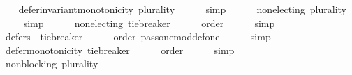 \begin{isabellebody}
\isanewline
\ \ \isamarkupfalse%
\ {}{}{}{}{}{\isacharcolon}{\kern0pt}\ {\isachardoublequoteopen}defer{\isacharunderscore}{\kern0pt}invariant{\isacharunderscore}{\kern0pt}monotonicity\ {\isacharparenleft}{\kern0pt}plurality{\isasymdown}{\isacharparenright}{\kern0pt}{\isachardoublequoteclose}\isanewline
\ \ \ \ \isamarkupfalse%
\ simp\ \isanewline
\ \ \isamarkupfalse%
\ {}{}{}{}{}{\isacharcolon}{\kern0pt}\ {\isachardoublequoteopen}non{\isacharunderscore}{\kern0pt}electing\ {\isacharparenleft}{\kern0pt}plurality{\isasymdown}{\isacharparenright}{\kern0pt}{\isachardoublequoteclose}\isanewline
\ \ \ \ \isamarkupfalse%
\ simp\ \isanewline
\ \ \isamarkupfalse%
\ {}{}{}{}{}{\isacharcolon}{\kern0pt}\ {\isachardoublequoteopen}non{\isacharunderscore}{\kern0pt}electing\ {\isacharquery}{\kern0pt}tie{\isacharunderscore}{\kern0pt}breaker{\isachardoublequoteclose}\isanewline
\ \ \ \ \isamarkupfalse%
\ order\isanewline
\ \ \ \ \isamarkupfalse%
\ simp\ \isanewline
\ \ \isamarkupfalse%
\ {}{}{}{}{}{\isacharcolon}{\kern0pt}\ {\isachardoublequoteopen}defers\ {}\ {\isacharquery}{\kern0pt}tie{\isacharunderscore}{\kern0pt}breaker{\isachardoublequoteclose}\isanewline
\ \ \ \ \isamarkupfalse%
\ order\ pass{\isacharunderscore}{\kern0pt}one{\isacharunderscore}{\kern0pt}mod{\isacharunderscore}{\kern0pt}def{\isacharunderscore}{\kern0pt}one\isanewline
\ \ \ \ \isamarkupfalse%
\ simp\isanewline
\ \ \isamarkupfalse%
\ {}{}{}{}{}{\isacharcolon}{\kern0pt}\ {\isachardoublequoteopen}defer{\isacharunderscore}{\kern0pt}monotonicity\ {\isacharquery}{\kern0pt}tie{\isacharunderscore}{\kern0pt}breaker{\isachardoublequoteclose}\isanewline
\ \ \ \ \isamarkupfalse%
\ order\isanewline
\ \ \ \ \isamarkupfalse%
\ simp\ \isanewline
\ \ \isamarkupfalse%
\ {}{}{}{}{}{\isacharcolon}{\kern0pt}\ {\isachardoublequoteopen}non{\isacharunderscore}{\kern0pt}blocking\ {\isacharparenleft}{\kern0pt}plurality{\isasymdown}{\isacharparenright}{\kern0pt}{\isachardoublequoteclose}\isanewline
\ \ \ \ \isamarkupfalse%

\end{isabellebody}
